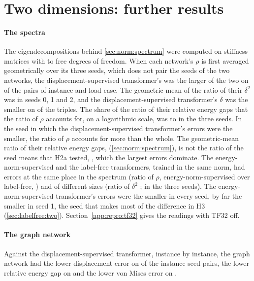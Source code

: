 \section{Two dimensions: further results}\label{supp:two}

\paragraph{The spectra}
The eigendecompositions behind \cref{sec:norm:spectrum} were computed on stiffness matrices
with \numSpecFreeMin{} to \numSpecFreeMax{} free degrees of freedom. When each network's
$\rho$ is first averaged geometrically over its three seeds, which does not pair the seeds
of the two networks, the displacement-supervised transformer's was the larger of the two on
\numSpecLabKnormAboveSeedGm{} of the \numSpecLoadCases{} pairs of instance and load case.
The geometric mean of the ratio of their $\delta^2$ was \numSpecLabKnormDispSeeds{} in seeds
0, 1 and 2, and the displacement-supervised transformer's $\delta$ was the smaller on
\numSpecLabKnormDispLower{} of the triples. The share of the ratio of their relative energy
gaps that the ratio of $\rho$ accounts for, on a logarithmic scale, was
\numSpecSpectralShareMin{} to \numSpecSpectralShareMax{} in the three seeds. In the seed in which the displacement-supervised transformer's errors were the smaller, the ratio of $\rho$
accounts for more than the whole. The geometric-mean ratio of their relative energy gaps,
\numSpecLabKnormGap{} (\cref{sec:norm:spectrum}), is not the ratio of the seed means that
H2a tested, \numCmLabOverKnormGap{}, which the largest errors dominate. The
energy-norm-supervised and the label-free transformers, trained in the same norm, had errors
at the same place in the spectrum (ratio of $\rho$, energy-norm-supervised over label-free,
\numSpecKnormFreeRq{}) and of different sizes (ratio of $\delta^2$ \numSpecKnormFreeDisp{};
\numSpecKnormFreeDispSeeds{} in the three seeds). The energy-norm-supervised transformer's
errors were the smaller in every seed, by far the smaller in seed 1, the seed that makes
most of the difference in H3 (\cref{sec:labelfree:two}). Section~\ref{app:repro:tf32} gives
the readings with TF32 off.

\paragraph{The graph network}
Against the displacement-supervised transformer, instance by instance, the graph network had
the lower displacement error on \numPairCmMgnLabDisp{} of the instance-seed pairs, the lower
relative energy gap on \numPairCmMgnLabGap{} and the lower von Mises error on
\numPairCmMgnLabVm{}.

